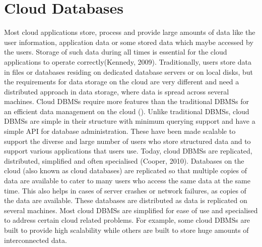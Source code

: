 

\section{Cloud Databases}\label{s:cloud-databases}

Most cloud applications store,   process and provide large amounts of data like
the user information,   application data or some stored data which maybe accessed
by the users.  Storage of such data during all times is essential for the cloud
applications to operate correctly(Kennedy,   2009). Traditionally,   users store data
in files or databases residing on dedicated database servers or on local disks,  
but the requirements for data storage on the cloud are very different and need a
distributed approach in data storage,   where data is spread across several
machines.  Cloud \acp{DBMS} require more features than the traditional \acp{DBMS}
for an efficient data management on the cloud ().  Unlike
traditional \acp{DBMS},   cloud \acp{DBMS} are simple in their structure with
minimum querying support and have a simple API for database
administration.  These have been made scalable to support the diverse
and large number of users who store structured data and to support various
applications that users use.  Today,   cloud \acp{DBMS} are replicated,   distributed,  
simplified and often specialised (Cooper,   2010).  Databases on the cloud
(also known as cloud databases) are replicated so that multiple copies of data
are available to cater to many users who access the same data at the same time.  This also helps in cases of server crashes or
network failures,   as copies of the data are available.  These databases are
distributed as data is replicated on several machines.  Most cloud \acp{DBMS} are
simplified for ease of use and specialised to address certain cloud related
problems.  For example,   some cloud \acp{DBMS} are built to provide high
scalability while others are built to store huge amounts of interconnected data. 

